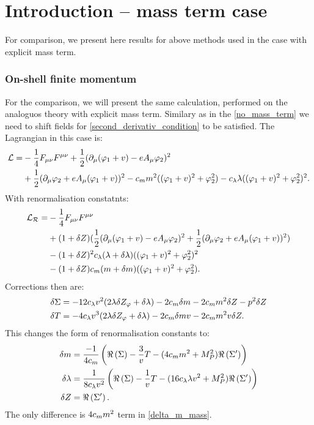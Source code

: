 \chapter{Introduction -- mass term case}
For comparison, we present here results for above methods used in the case with explicit mass term.

\subsection{On-shell finite momentum}
For the comparison, we will present the same calculation, performed on the analoguos theory with 
explicit mass term. Similary as in the \ref{no_mass_term} we need to shift fields for 
\ref{second_derivativ_condition} to be satisfied. The Lagrangian in this case is:
\begin{align}\label{mass_term_lagrangian}
\mathcal{L} = &-\frac{1}{4}F_{\mu\nu}F^{\mu\nu}+ 
\frac{1}{2}(\partial_\mu(\varphi_1+v) - eA_\mu\varphi_2)^2\\
&+\frac{1}{2}(\partial_\mu\varphi_2+eA_\mu(\varphi_1+v))^2 - c_m m^2((\varphi_1+v)^2+\varphi_2^2)
-c_\lambda\lambda((\varphi_1+v)^2+\varphi_2^2)^2. \notag
\end{align}
With renormalisation constatnts:
\begin{align}
\mathcal{L_R} = &-\frac{1}{4}F_{\mu\nu}F^{\mu\nu} \\
&+(1+ \delta Z)(\frac{1}{2}(\partial_\mu(\varphi_1+v) - eA_\mu\varphi_2)^2
+\frac{1}{2}(\partial_\mu\varphi_2+eA_\mu(\varphi_1+v))^2) \notag \\
&-(1+\delta Z)^2c_\lambda(\lambda+\delta\lambda)((\varphi_1+v)^2+\varphi_2^2)^2  \notag \\
&-(1+\delta Z)c_m(m+\delta m)((\varphi_1+v)^2+\varphi_2^2).
\end{align}
Corrections then are:
\begin{align}
\delta\Sigma&=-12c_\lambda v^2(2\lambda\delta Z_\varphi+\delta\lambda)-2c_m\delta m-2c_m m^2\delta Z -p^2\delta Z \\
\delta T&=-4c_\lambda v^3(2\lambda\delta Z_\varphi+\delta\lambda)-2c_m\delta m v-2c_m m^2v\delta Z.
\end{align}
This changes the form of renormalisation constants to:
\begin{align}
\delta m &= \frac{-1}{4c_m}\left(\Re\left(\Sigma\right)-\frac{3}{v}T-(4c_m m^2+M_P^2)\Re\left(\Sigma'\right)
\right)\label{delta_m_mass}\\
\delta\lambda &= \frac{1}{8c_\lambda v^2}\left(\Re\left(\Sigma\right)-\frac{1}{v}T-(16c_\lambda\lambda v^2+M_P^2)
\Re\left(\Sigma'\right)
\right)\\
\delta Z &= \Re\left(\Sigma'\right).
\end{align}
The only difference is $4c_m m^2$ term in \ref{delta_m_mass}. 
